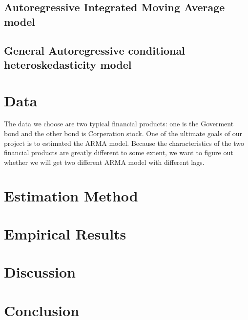 \documentclass[12pt,letterpaper]{article}
\begin{document}
\subsection{Autoregressive Integrated Moving Average model}
\subsection{General Autoregressive conditional heteroskedasticity model}

\section{Data}
         The data we choose are two typical financial products: one is the Goverment bond and 
         the other bond is Corperation stock. One of the ultimate goals of our project is to 
         estimated the ARMA model. Because the characteristics of the two financial products 
         are greatly different to some extent, we want to figure out whether we will get two 
         different ARMA model with different lags.

\section{Estimation Method}

\section{Empirical Results}

\section{Discussion}

\section{Conclusion}
\end{document}
